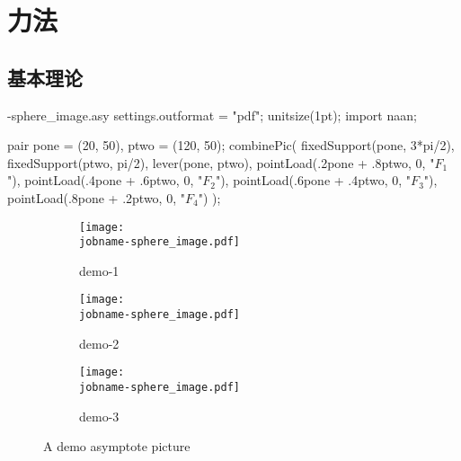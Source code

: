 \chapter{力法}

\section{基本理论}

\begin{filecontents*}{\jobname-sphere_image.asy}
settings.outformat = "pdf";
unitsize(1pt);
import naan;

pair pone = (20, 50), ptwo = (120, 50);
combinePic(
    fixedSupport(pone, 3*pi/2),
    fixedSupport(ptwo, pi/2),
    lever(pone, ptwo),
    pointLoad(.2pone + .8ptwo, 0, "$F_1$"),
    pointLoad(.4pone + .6ptwo, 0, "$F_2$"),
    pointLoad(.6pone + .4ptwo, 0, "$F_3$"),
    pointLoad(.8pone + .2ptwo, 0, "$F_4$")
);
\end{filecontents*}

\begin{figure}[H]
\centering
\begin{subfigure}{.3\hsize}
    \centering
    \texttt{[image: \\jobname-sphere\_image.pdf]}
    \caption{demo-1}
\end{subfigure}
\begin{subfigure}{.3\hsize}
    \centering
    \texttt{[image: \\jobname-sphere\_image.pdf]}
    \caption{demo-2}
\end{subfigure}
\begin{subfigure}{.3\hsize}
    \centering
    \texttt{[image: \\jobname-sphere\_image.pdf]}
    \caption{demo-3}
\end{subfigure}
\caption{A demo asymptote picture}
\end{figure}